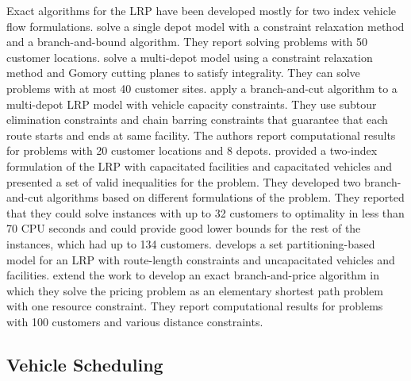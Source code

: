 

Exact algorithms for the LRP have been developed mostly for two index vehicle flow formulations. 
\citet{Laporte81} solve a single depot model with a constraint relaxation method
and a branch-and-bound algorithm. They report solving problems with 50 customer locations.
\citet{Laporte83} solve a multi-depot model using a constraint
relaxation method and Gomory cutting planes to satisfy integrality. They can solve problems
with at most 40 customer sites. \citet{Laporte86}
apply a branch-and-cut algorithm to a multi-depot LRP model with vehicle capacity constraints. They
use subtour elimination constraints and chain barring constraints that guarantee that each route
starts and ends at same facility. The authors report computational results for problems with 20
customer locations and 8 depots. \citet{Belenguer06} provided a two-index formulation of
the LRP with capacitated facilities and capacitated vehicles and
presented a set of valid inequalities for the problem. They developed
two branch-and-cut algorithms based on different formulations of the
problem. They reported that they could solve instances with up to
32 customers to optimality in less than 70 CPU seconds and could provide
good lower bounds for the rest of the instances, which had up to 134
customers.
\citet{Berger} develops a set partitioning-based model for an LRP with route-length constraints and 
uncapacitated vehicles and facilities. \citet{Berger05} extend the work to develop an exact 
branch-and-price algorithm in which they solve the pricing problem as an elementary shortest 
path problem with one resource constraint. They report computational results for problems with 
100 customers and various distance constraints. 



\subsection{Vehicle Scheduling}

